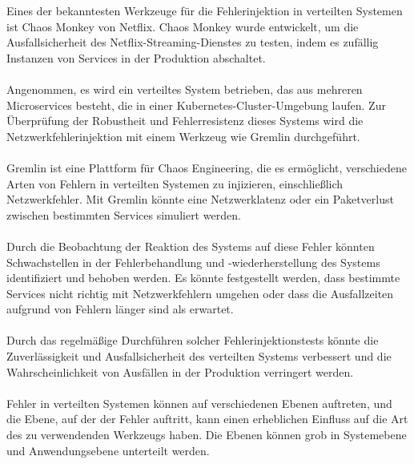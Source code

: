 Eines der bekanntesten Werkzeuge für die Fehlerinjektion in verteilten Systemen ist Chaos Monkey von Netflix. Chaos Monkey wurde entwickelt, um die Ausfallsicherheit des Netflix-Streaming-Dienstes zu testen, indem es zufällig Instanzen von Services in der Produktion abschaltet.
\\\\
Angenommen, es wird ein verteiltes System betrieben, das aus mehreren Microservices besteht, die in einer Kubernetes-Cluster-Umgebung laufen. Zur Überprüfung der Robustheit und Fehlerresistenz dieses Systems wird die Netzwerkfehlerinjektion mit einem Werkzeug wie Gremlin durchgeführt.
\\\\
Gremlin ist eine Plattform für Chaos Engineering, die es ermöglicht, verschiedene Arten von Fehlern in verteilten Systemen zu injizieren, einschließlich Netzwerkfehler. Mit Gremlin könnte eine Netzwerklatenz oder ein Paketverlust zwischen bestimmten Services simuliert werden.
\\\\
Durch die Beobachtung der Reaktion des Systems auf diese Fehler könnten Schwachstellen in der Fehlerbehandlung und -wiederherstellung des Systems identifiziert und behoben werden. Es könnte festgestellt werden, dass bestimmte Services nicht richtig mit Netzwerkfehlern umgehen oder dass die Ausfallzeiten aufgrund von Fehlern länger sind als erwartet.
\\\\
Durch das regelmäßige Durchführen solcher Fehlerinjektionstests könnte die Zuverlässigkeit und Ausfallsicherheit des verteilten Systems verbessert und die Wahrscheinlichkeit von Ausfällen in der Produktion verringert werden.
\\\\
Fehler in verteilten Systemen können auf verschiedenen Ebenen auftreten, und die Ebene, auf der der Fehler auftritt, kann einen erheblichen Einfluss auf die Art des zu verwendenden Werkzeugs haben. Die Ebenen können grob in Systemebene und Anwendungsebene unterteilt werden.

